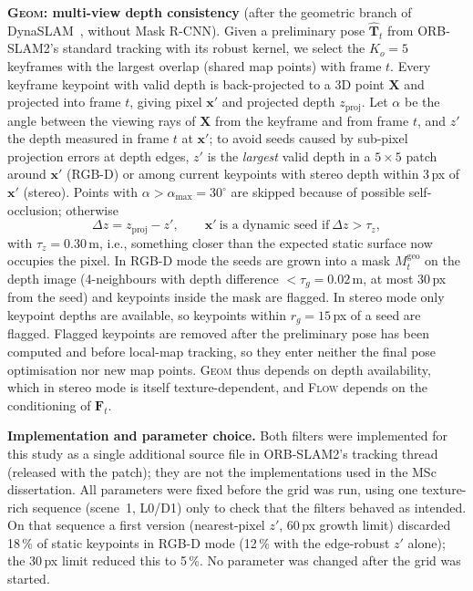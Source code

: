 \documentclass[conference]{IEEEtran}
\newcommand{\flow}{\textsc{Flow}}
\newcommand{\geom}{\textsc{Geom}}
\begin{document}
\textbf{\geom{}: multi-view depth consistency} (after the geometric branch of DynaSLAM~\cite{bescos2018dynaslam}, without Mask R-CNN). Given a preliminary pose $\hat{\mathbf{T}}_t$ from ORB-SLAM2's standard tracking with its robust kernel, we select the $K_o=5$ keyframes with the largest overlap (shared map points) with frame $t$. Every keyframe keypoint with valid depth is back-projected to a 3D point $\mathbf{X}$ and projected into frame $t$, giving pixel $\mathbf{x}'$ and projected depth $z_{\mathrm{proj}}$. Let $\alpha$ be the angle between the viewing rays of $\mathbf{X}$ from the keyframe and from frame $t$, and $z'$ the depth measured in frame $t$ at $\mathbf{x}'$; to avoid seeds caused by sub-pixel projection errors at depth edges, $z'$ is the \emph{largest} valid depth in a $5\times5$ patch around $\mathbf{x}'$ (RGB-D) or among current keypoints with stereo depth within 3\,px of $\mathbf{x}'$ (stereo). Points with $\alpha>\alpha_{\max}=30^\circ$ are skipped because of possible self-occlusion; otherwise
\begin{equation}
\Delta z=z_{\mathrm{proj}}-z',\qquad \mathbf{x}'\ \text{is a dynamic seed if}\ \Delta z>\tau_z,
\label{eq:geom}
\end{equation}
with $\tau_z=0.30$\,m, i.e., something closer than the expected static surface now occupies the pixel. In RGB-D mode the seeds are grown into a mask $M^{\mathrm{geo}}_t$ on the depth image (4-neighbours with depth difference $<\tau_g=0.02$\,m, at most 30\,px from the seed) and keypoints inside the mask are flagged. In stereo mode only keypoint depths are available, so keypoints within $r_g=15$\,px of a seed are flagged. Flagged keypoints are removed after the preliminary pose has been computed and before local-map tracking, so they enter neither the final pose optimisation nor new map points. \geom{} thus depends on depth availability, which in stereo mode is itself texture-dependent, and \flow{} depends on the conditioning of $\mathbf{F}_t$.

\textbf{Implementation and parameter choice.} Both filters were implemented for this study as a single additional source file in ORB-SLAM2's tracking thread (released with the patch); they are not the implementations used in the MSc dissertation. All parameters were fixed before the grid was run, using one texture-rich sequence (scene~1, L0/D1) only to check that the filters behaved as intended. On that sequence a first version (nearest-pixel $z'$, 60\,px growth limit) discarded 18\,\% of static keypoints in RGB-D mode (12\,\% with the edge-robust $z'$ alone); the 30\,px limit reduced this to 5\,\%. No parameter was changed after the grid was started.
\end{document}
